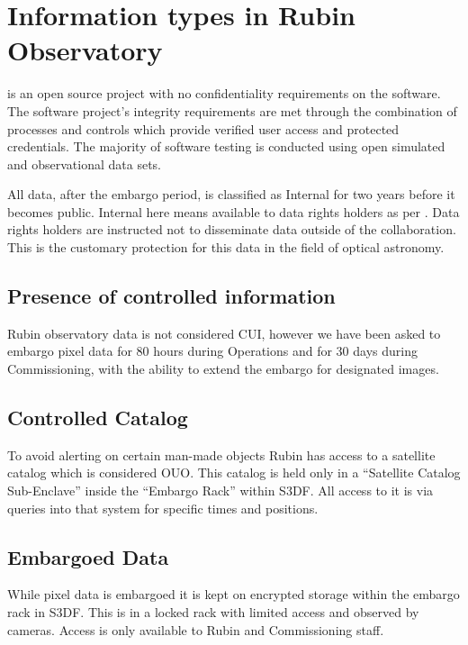 \section{Information types in Rubin Observatory} \label{sec:infotypes}

\VRO is an open source project with no confidentiality requirements on the \gls{software}.
The \gls{software} project’s integrity requirements are met through the combination of
processes and controls which provide verified user access and protected credentials.
The majority of \gls{software} testing is conducted using open simulated and observational data sets.

All data, after the embargo period,  is classified as Internal for two years before it becomes public.
Internal here means available to data rights holders as per .
Data rights holders are instructed not to disseminate data outside of the collaboration.
This is the customary protection for this data in the field of optical astronomy.

\subsection{Presence of controlled information}\label{sec:cui}
Rubin observatory data is not considered \gls{CUI}, however we have been asked to embargo pixel data for 80 hours during \gls{Operations} and for 30 days during Commissioning, with the ability to extend the embargo for designated images.

\subsection{Controlled Catalog}\label{sec:controllescat}
To avoid alerting on certain man-made objects Rubin has access to a satellite catalog which is considered \gls{OUO}.
This catalog is held only in a ``Satellite Catalog Sub-Enclave'' inside the ``Embargo Rack'' within \gls{S3DF}.
All access to it is via queries into that system for specific times and positions.

\subsection{Embargoed Data} \label{sec:embargo}
While pixel data is embargoed it is kept on encrypted storage within the embargo rack in \gls{S3DF}.
This is in a locked rack with limited access and observed by cameras.
Access is only available to Rubin and \gls{Commissioning} staff.


